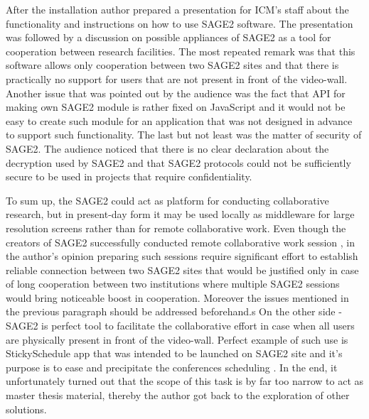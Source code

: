 \documentclass[magisterska,en]{pracamgr}
\begin{document}
 After the installation author prepared a presentation for ICM's staff about the functionality and instructions on how to use SAGE2 software. The presentation was followed by a discussion on possible appliances of SAGE2 as a tool for cooperation between research facilities. The most repeated remark was that this software allows only cooperation between two SAGE2 sites and that there is practically no support for users that are not present in front of the video-wall. Another issue that was pointed out by the audience was the fact that API for making own SAGE2 module is rather fixed on JavaScript and it would not be easy to create such module for an application that was not designed in advance to support such functionality. The last but not least was the matter of security of SAGE2. The audience noticed that there is no clear declaration about the decryption used by SAGE2 and that SAGE2 protocols could not be sufficiently secure to be used in projects that require confidentiality.
 
 To sum up, the SAGE2 could act as platform for conducting collaborative research, but in present-day form it may be used locally as middleware for large resolution screens rather than for remote collaborative work. Even though the creators of SAGE2 successfully conducted remote collaborative work session \cite{SAGE2_developers}, in the author's opinion preparing such sessions require significant effort to establish reliable connection between two SAGE2 sites that would be justified only in case of long cooperation between two institutions where multiple SAGE2 sessions would bring noticeable boost in cooperation. Moreover the issues mentioned in the previous paragraph should be addressed beforehand.s On the other side - SAGE2 is perfect tool to facilitate the collaborative effort in case when all users are physically present in front of the video-wall. Perfect example of such use is StickySchedule app that was intended to be launched on SAGE2 site and it's purpose is to ease and precipitate the conferences scheduling \cite{SAGE2_Conference_Scheduling}.
 In the end, it unfortunately turned out that the scope of this task is by far too narrow to act as master thesis material, thereby the author got back to the exploration of other solutions.
 
\end{document}
